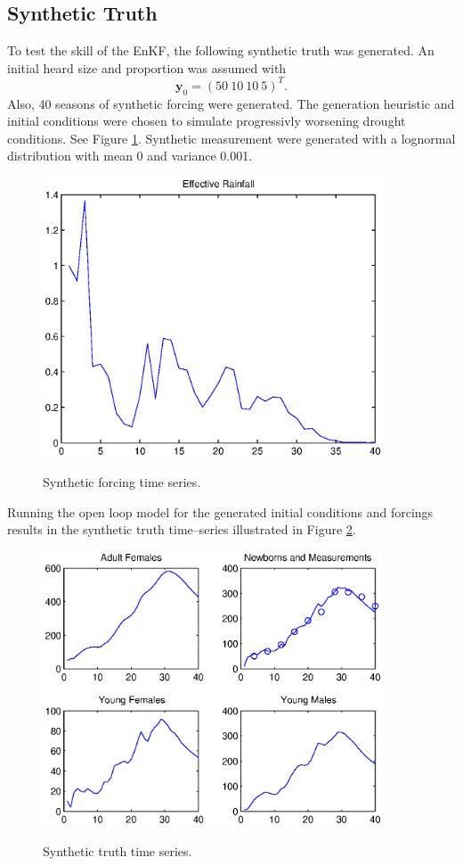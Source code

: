 \documentclass[fleqn, letterpaper]{article}
\numberwithin{figure}{section}
\newcommand{\vecy}{\mathbf{y}}
\begin{document}
\subsection{Synthetic Truth}
To test the skill of the EnKF, the following synthetic truth was generated. An initial heard size and proportion was assumed with
\[\vecy_0 = (50\ 10\ 10\ 5)^T.\]
Also, 40 seasons of synthetic forcing were generated. The generation heuristic and initial conditions were chosen to simulate progressivly worsening drought conditions. See Figure \ref{forcing}.
Synthetic measurement were generated with a lognormal distribution with mean 0 and variance 0.001. 
\begin{figure}
\includegraphics[width=0.9\textwidth]{rforcing}
\label{forcing}
\caption{Synthetic forcing time series.}
\end{figure}
Running the open loop model for the generated initial conditions and forcings results in the synthetic truth time--series illustrated in Figure \ref{rtruth}.
\begin{figure}
\includegraphics[width=0.9\textwidth]{rtruth}
\label{rtruth}
\caption{Synthetic truth time series.}
\end{figure}
\end{document}
